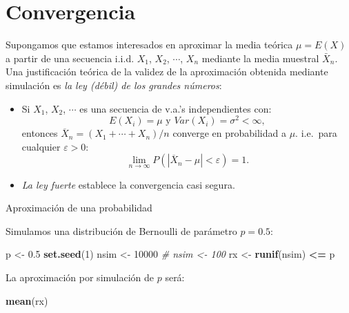 \documentclass[
]{book}
\newenvironment{Shaded}{\begin{snugshade}}{\end{snugshade}}
\newcommand{\CommentTok}[1]{\textcolor[rgb]{0.56,0.35,0.01}{\textit{#1}}}
\newcommand{\DecValTok}[1]{\textcolor[rgb]{0.00,0.00,0.81}{#1}}
\newcommand{\FloatTok}[1]{\textcolor[rgb]{0.00,0.00,0.81}{#1}}
\newcommand{\KeywordTok}[1]{\textcolor[rgb]{0.13,0.29,0.53}{\textbf{#1}}}
\newcommand{\NormalTok}[1]{#1}
\newcommand{\OperatorTok}[1]{\textcolor[rgb]{0.81,0.36,0.00}{\textbf{#1}}}
\newcommand{\StringTok}[1]{\textcolor[rgb]{0.31,0.60,0.02}{#1}}
\theoremstyle{break}
\theoremstyle{definition}
\theoremstyle{definition}
\theoremstyle{definition}
\theoremstyle{remark}
\let\BeginKnitrBlock\begin \let\EndKnitrBlock\end
\begin{document}
\hypertarget{convergencia}{%
\section{Convergencia}\label{convergencia}}

Supongamos que estamos interesados en aproximar la media teórica
\(\mu = E\left( X\right)\) a partir de una secuencia i.i.d. \(X_{1}\),
\(X_{2}\), \(\cdots\), \(X_{n}\) mediante la media muestral \(\bar{X}_{n}\).
Una justificación teórica de la validez de la aproximación obtenida
mediante simulación es \emph{la ley (débil) de los grandes números}:

\begin{itemize}
\item
  Si \(X_{1}\), \(X_{2}\), \(\cdots\) es una secuencia de v.a.'s
  independientes con:
  \[E\left( X_{i}\right) =\mu \text{ y }Var\left( X_{i}\right) 
  =\sigma^{2}<\infty,\]
  entonces \(\overline{X}_{n}=\left( X_{1}+\cdots +X_{n}\right) /n\)
  converge en probabilidad a \(\mu\). i.e.~para cualquier \(\varepsilon >0\):
  \[\lim\limits_{n\rightarrow \infty }P\left( \left\vert \overline{X}_{n}-\mu
  \right\vert <\varepsilon \right) = 1.\]
\item
  \emph{La ley fuerte} establece la convergencia casi segura.
\end{itemize}

\BeginKnitrBlock{example}
\protect\hypertarget{exm:unnamed-chunk-2}{}{\label{exm:unnamed-chunk-2} }Aproximación de una probabilidad
\EndKnitrBlock{example}

Simulamos una distribución de Bernoulli de parámetro \(p=0.5\):

\begin{Shaded}
\begin{Highlighting}[]
\NormalTok{p <-}\StringTok{ }\FloatTok{0.5}
\KeywordTok{set.seed}\NormalTok{(}\DecValTok{1}\NormalTok{)}
\NormalTok{nsim <-}\StringTok{ }\DecValTok{10000}
\CommentTok{# nsim <- 100}
\NormalTok{rx <-}\StringTok{ }\KeywordTok{runif}\NormalTok{(nsim) }\OperatorTok{<=}\StringTok{ }\NormalTok{p}
\end{Highlighting}
\end{Shaded}

La aproximación por simulación de \(p\) será:

\begin{Shaded}
\begin{Highlighting}[]
\KeywordTok{mean}\NormalTok{(rx) }
\end{Highlighting}
\end{Shaded}
\end{document}
